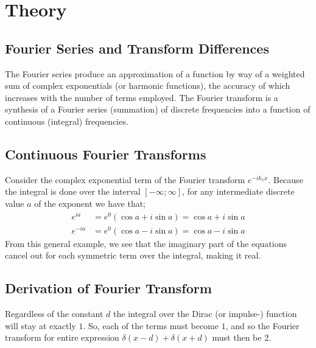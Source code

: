 %
%

\section{Theory}

\subsection{Fourier Series and Transform Differences}
The Fourier series produce an approximation of a function by way of a weighted
sum of complex exponentials (or harmonic functions), the accuracy of which
increases with the number of terms employed. The Fourier transform is a
synthesis of a Fourier series (summation) of discrete frequencies into a
function of continuous (integral) frequencies.

\subsection{Continuous Fourier Transforms}
Consider the complex exponential term of the Fourier transform $e^{-ik_xx}$.
Because the integral is done over the interval $[-\infty;\infty]$, for any
intermediate discrete value $a$ of the exponent we have that;
\begin{align}
    e^{ia}
    &= e^0 (\cos a + i \sin a)
    = \cos a + i \sin a
    \\
    e^{-ia}
    &=e^0 (\cos a - i \sin a)
    = \cos a - i \sin a
\end{align}
From this general example, we see that the imaginary part of the equations
cancel out for each symmetric term over the integral, making it real.


\subsection{Derivation of Fourier Transform}
Regardless of the constant $d$ the integral over the Dirac (or impulse-)
function will stay at exactly $1$. So, each of the terms must become $1$, and
so the Fourier transform for entire expression $\delta(x - d) + \delta(x + d)$
must then be $2$. 

